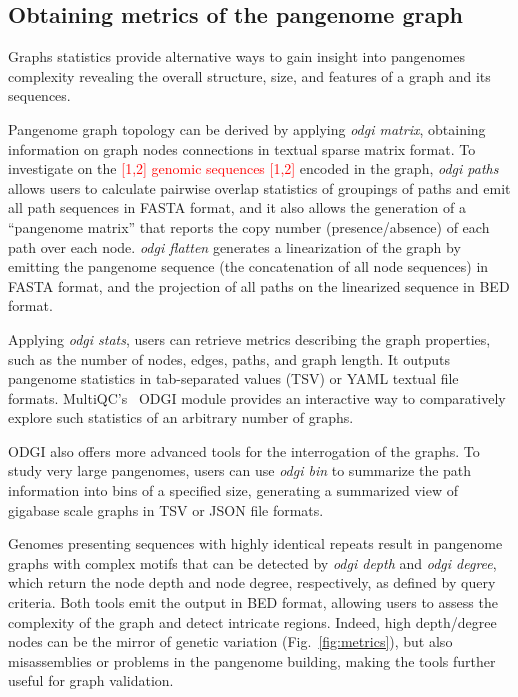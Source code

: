 \documentclass{bioinfo}
\newcommand{\REVIEWED}[1]{{\textcolor{Red}{#1}}}
\begin{document}
\subsection{Obtaining metrics of the pangenome graph}
\label{sec:metrics}

Graphs statistics provide alternative ways to gain insight into pangenomes complexity revealing the overall structure, size, and features of a graph and its sequences.

Pangenome graph topology can be derived by applying \textit{odgi matrix}, obtaining information on graph nodes connections in textual sparse matrix format.
To investigate on the \REVIEWED{[1,2] genomic sequences [1,2]} encoded in the graph, \textit{odgi paths} allows users to calculate pairwise overlap statistics of groupings of paths and emit all path sequences in FASTA format, and it also allows the generation of a ``pangenome matrix'' that reports the copy number (presence/absence) of each path over each node.
\textit{odgi flatten} generates a linearization of the graph by emitting the pangenome sequence (the concatenation of all node sequences) in FASTA format, and the projection of all paths on the linearized sequence in BED format.

Applying \textit{odgi stats}, users can retrieve metrics describing the graph properties, such as the number of nodes, edges, paths, and graph length.
It outputs pangenome statistics in tab-separated values (TSV) or YAML textual file formats.
MultiQC's~\citep{Ewels_2016} ODGI module %
provides an interactive way to comparatively explore such statistics of an arbitrary number of graphs.

ODGI also offers more advanced tools for the interrogation of the graphs.
To study very large pangenomes, users can use \textit{odgi bin} to summarize the path information into bins of a specified size, generating a summarized view of gigabase scale graphs in TSV or JSON file formats.

Genomes presenting sequences with highly identical repeats result in pangenome graphs with complex motifs that can be detected by \textit{odgi depth} and \textit{odgi degree}, which return the node depth and node degree, respectively, as defined by query criteria.
Both tools emit the output in BED format, allowing users to assess the complexity of the graph and detect intricate regions.
Indeed, high depth/degree nodes can be the mirror of genetic variation (Fig.~\ref{fig:metrics}), but also misassemblies or problems in the pangenome building, making the tools further useful for graph validation.
\end{document}
